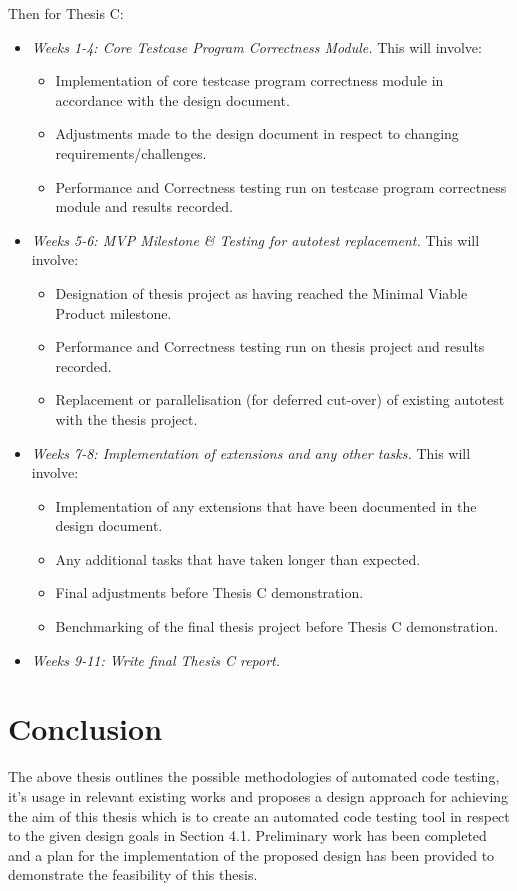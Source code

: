 \documentclass[hidelinks, 12pt]{extreport}
\newcommand{\unchapter}[2]{
    \setcounter{chapter}{#1}
    \setcounter{section}{0}
    \chapter*{#2}
    \addcontentsline{toc}{chapter}{#2}
}
\begin{document}
Then for Thesis C:
\begin{itemize}
	\item \textit{Weeks 1-4: Core Testcase Program Correctness Module.} This will involve:
	\begin{itemize}
		\item Implementation of core testcase program correctness module in accordance with the design document.
		\item Adjustments made to the design document in respect to changing requirements/challenges.
		\item Performance and Correctness testing run on testcase program correctness module and results recorded.
	\end{itemize}
	\item \textit{Weeks 5-6: MVP Milestone \& Testing for autotest replacement.} This will involve:
	\begin{itemize}
		\item Designation of thesis project as having reached the Minimal Viable Product milestone.
		\item Performance and Correctness testing run on thesis project and results recorded.
		\item Replacement or parallelisation (for deferred cut-over) of existing autotest with the thesis project.
	\end{itemize}
	\item \textit{Weeks 7-8: Implementation of extensions and any other tasks.} This will involve:
	\begin{itemize}
		\item Implementation of any extensions that have been documented in the design document.
		\item Any additional tasks that have taken longer than expected.
		\item Final adjustments before Thesis C demonstration.
		\item Benchmarking of the final thesis project before Thesis C demonstration.
	\end{itemize}
	\item \textit{Weeks 9-11: Write final Thesis C report.}
\end{itemize}

\unchapter{6}{Conclusion}

The above thesis outlines the possible methodologies of automated code testing, it's usage in relevant existing works and proposes a design approach for achieving the aim of this thesis which is to create an automated code testing tool in respect to the given design goals in Section 4.1.
Preliminary work has been completed and a plan for the implementation of the proposed design has been provided to demonstrate the feasibility of this thesis.
\end{document}
